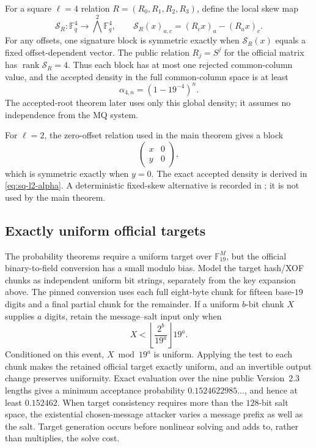 \documentclass[11pt]{article}
\newcommand{\F}{\mathbb F}
\newcommand{\rank}{\operatorname{rank}}
\begin{document}
For a square $\ell=4$ relation $R=(R_0,R_1,R_2,R_3)$, define the local skew
map
\[
 \mathcal S_R:\F_q^4\longrightarrow\bigwedge^2\F_q^4,
 \qquad
 \mathcal S_R(x)_{a,c}=(R_cx)_a-(R_ax)_c.
\]
For any offsets, one signature block is symmetric exactly when
$\mathcal S_R(x)$ equals a fixed offset-dependent vector.  The public relation
$R_j=S^j$ for the official matrix has $\rank\mathcal S_R=4$.  Thus each
block has at most one rejected common-column value, and the accepted density
in the full common-column space is at least
\begin{equation}
  \alpha_{4,n}=(1-19^{-4})^n.                        \label{eq:l4-acceptance}
\end{equation}
The accepted-root theorem later uses only this global density; it assumes no
independence from the MQ system.

For $\ell=2$, the zero-offset relation used in the main theorem gives a block
\[
 \begin{pmatrix}x&0\\y&0\end{pmatrix},
\]
which is symmetric exactly when $y=0$.  The exact accepted density is derived
in \eqref{eq:sq-l2-alpha}.  A deterministic fixed-skew alternative is recorded
in ; it is not used by the main theorem.

\subsection{Exactly uniform official targets}
The probability theorems require a uniform target over $\F_{19}^M$, but the
official binary-to-field conversion has a small modulo bias.  Model the target
hash/XOF chunks as independent uniform bit strings, separately from the key
expansion above.  The pinned conversion uses each full eight-byte chunk for
fifteen base-$19$ digits and a final partial chunk for the remainder.  If a
uniform $b$-bit chunk $X$ supplies $a$ digits, retain the message--salt input
only when
\begin{equation}
  X<\left\lfloor\frac{2^b}{19^a}\right\rfloor19^a.   \label{eq:target-rejection-sampling}
\end{equation}
Conditioned on this event, $X\bmod19^a$ is uniform.  Applying the test to each
chunk makes the retained official target exactly uniform, and an invertible
output change preserves uniformity.  Exact evaluation over the nine public
Version~2.3 lengths gives a minimum acceptance probability
$0.1524622985\ldots$, and hence at least $0.152462$.
When target consistency requires more than the $128$-bit salt space, the
existential chosen-message attacker varies a message prefix as well as the
salt.  Target generation occurs before nonlinear solving and adds to, rather
than multiplies, the solve cost.
\end{document}
